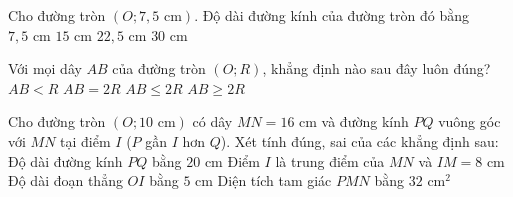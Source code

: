 

\begin{ex}%
	Cho đường tròn $(O; 7{,}5\text{ cm})$. Độ dài đường kính của đường tròn đó bằng
	\choice
	{$7{,}5\text{ cm}$}
	{\True $15\text{ cm}$}
	{$22{,}5\text{ cm}$}
	{$30\text{ cm}$}
\end{ex}

\begin{ex}%
	Với mọi dây $AB$ của đường tròn $(O; R)$, khẳng định nào sau đây luôn đúng?
	\choice
	{$AB < R$}
	{$AB = 2R$}
	{\True $AB \le 2R$}
	{$AB \ge 2R$}
\end{ex}

\begin{ex}%
	Cho đường tròn $(O; 10\text{ cm})$ có dây $MN = 16\text{ cm}$ và đường kính $PQ$ vuông góc với $MN$ tại điểm $I$ ($P$ gần $I$ hơn $Q$). Xét tính đúng, sai của các khẳng định sau:
	\choiceTF
	{\True Độ dài đường kính $PQ$ bằng $20\text{ cm}$}
	{\True Điểm $I$ là trung điểm của $MN$ và $IM = 8\text{ cm}$}
	{Độ dài đoạn thẳng $OI$ bằng $5\text{ cm}$}
	{\True Diện tích tam giác $PMN$ bằng $32\text{ cm}^2$}
\end{ex}

